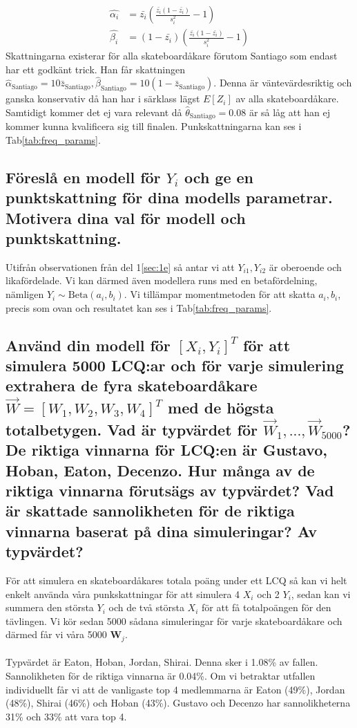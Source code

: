 \documentclass{article}
\begin{document}
\begin{align}
    \hat{\alpha_i} &= \bar{z_i} (\frac{\bar{z_i}(1-\bar{z_i})}{s_i^2} - 1) \\
    \hat{\beta_i} &= (1-\bar{z_i}) (\frac{\bar{z_i}(1-\bar{z_i})}{s_i^2} - 1)
\end{align}
Skattningarna existerar för alla skateboardåkare förutom Santiago som endast har ett godkänt trick. Han får skattningen $\hat{\alpha}_{\text{Santiago}} = 10 \bar{z}_{\text{Santiago}}, \hat{\beta}_{\text{Santiago}} = 10(1-\bar{z}_{\text{Santiago}})$.
Denna är väntevärdesriktig och ganska konservativ då han har i särklass lägst $E[Z_i]$ av alla skateboardåkare. Samtidigt kommer det ej vara relevant då $\hat{\theta}_{\text{Santiago}} = 0.08$ är så låg att han ej kommer kunna kvalificera sig till finalen.
Punkskattningarna kan ses i Tab\ref{tab:freq_params}.

\subsection{Föreslå en modell för $Y_i$ och ge en punktskattning för dina modells parametrar. Motivera dina val för modell och punktskattning.}
Utifrån observationen från del 1\ref{sec:1e} så antar vi att $Y_{i1}, Y_{i2}$ är oberoende och likafördelade.
Vi kan därmed även modellera runs med en betafördelning, nämligen $Y_i \sim \text{Beta}(a_i, b_i)$. 
Vi tillämpar momentmetoden för att skatta $a_i, b_i$, precis som ovan och resultatet kan ses i Tab\ref{tab:freq_params}.

\subsection{Använd din modell för $[X_i,Y_i]^T$ för att simulera 5000 LCQ:ar och för varje simulering extrahera de fyra skateboardåkare $\vec{W} = [W_1,W_2,W_3,W_4]^T$ med
de högsta totalbetygen. Vad är typvärdet för $\vec{W}_1, ..., \vec{W}_{5000}$? De riktiga vinnarna för LCQ:en är Gustavo, Hoban, Eaton, Decenzo.
Hur många av de riktiga vinnarna förutsägs av typvärdet? Vad är skattade sannolikheten för de riktiga vinnarna baserat på dina simuleringar? Av typvärdet?}

För att simulera en skateboardåkares totala poäng under ett LCQ så kan vi helt enkelt använda våra punkskattningar för att
simulera 4 $X_i$ och 2 $Y_i$, sedan kan vi summera den största $Y_i$ och de två största $X_i$ för att få totalpoängen för den tävlingen.
Vi kör sedan 5000 sådana simuleringar för varje skateboardåkare och därmed får vi våra 5000 $\mathbf{W}_j$.
\\ \\
Typvärdet är Eaton, Hoban, Jordan, Shirai. Denna sker i 1.08\% av fallen. Sannolikheten för de riktiga vinnarna är 0.04\%. 
Om vi betraktar utfallen individuellt får vi att de vanligaste top 4 medlemmarna är Eaton (49\%), Jordan (48\%), Shirai (46\%) och Hoban (43\%). 
Gustavo och Decenzo har sannolikheterna 31\% och 33\% att vara top 4.
\end{document}
